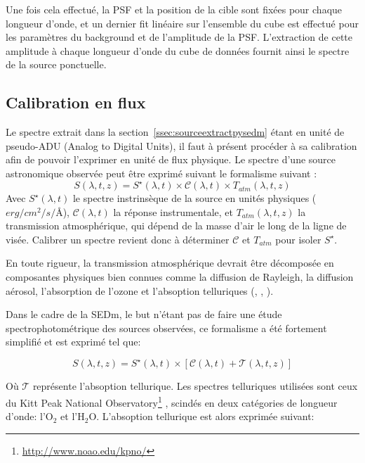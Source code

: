 \documentclass[../main/main.tex]{subfiles}
\begin{document}
Une fois cela effectué, la PSF et la position de la cible sont fixées pour
chaque longueur d'onde, et un dernier fit linéaire sur l'ensemble du
cube est effectué pour les
paramètres du background et de l'amplitude de la PSF. L'extraction de
cette amplitude à chaque longueur d'onde du cube de données fournit
ainsi le spectre de la source ponctuelle.


\subsection{Calibration en flux}\label{ssec:calibpysedm}

Le spectre extrait dans la section~\ref{ssec:sourceextractpysedm} étant en
unité de pseudo-ADU (Analog to Digital Units), il faut à présent procéder à sa
calibration afin de pouvoir l'exprimer en unité de flux physique.
Le spectre d'une source astronomique observée peut être exprimé suivant
le formalisme suivant \citep{Buton2013}:
\begin{equation}
  \label{eq:calibbutoon}
  S(\lambda,t,z)=S^{\star}(\lambda,t)\times\mathcal{C}(\lambda,t)\times T_{atm}(\lambda,t,z)
\end{equation}
Avec $S^{\star}(\lambda,t)$ le spectre instrinsèque de la source en
unités physiques ($erg/cm^2/s/$\AA), $\mathcal{C}(\lambda,t)$ la réponse
instrumentale, et $T_{atm}(\lambda,t,z)$ la transmission atmosphérique, qui
dépend de la masse d'air le long de la ligne de visée. Calibrer un
spectre revient donc à déterminer $\mathcal{C}$ et $T_{atm}$ pour isoler $S^{\star}$.

En toute rigueur, la transmission atmosphérique devrait être décomposée
en composantes physiques bien connues comme la diffusion de Rayleigh, la
diffusion aérosol,
l'absorption de l'ozone et l'absoption telluriques
(\citet{Hayes1975atm}, \citet{Wade1988atm}, \citet{Stubbs2007atm} ).

Dans le cadre de la SEDm, le but n'étant pas de faire une étude
spectrophotométrique des sources observées, ce formalisme a été
fortement simplifié et est exprimé tel que:

\begin{equation}
  \label{eq:calibbutoon}
  S(\lambda,t,z)=S^{\star}(\lambda,t)\times\left[\mathcal{C}(\lambda,t)+\mathcal{ T}(\lambda,t,z)\right]
\end{equation}

Où $\mathcal{ T}$ représente l'absoption tellurique. Les spectres
telluriques utilisées sont ceux du Kitt Peak National
Observatory\footnote{\url{http://www.noao.edu/kpno/}} \citep{Hinkle2003}, scindés en deux
catégories de longueur d'onde: l'$\text{O}_{2}$ et
l'$\text{H}_{2}\text{O}$.
L'absoption tellurique est alors exprimée suivant:
\end{document}
